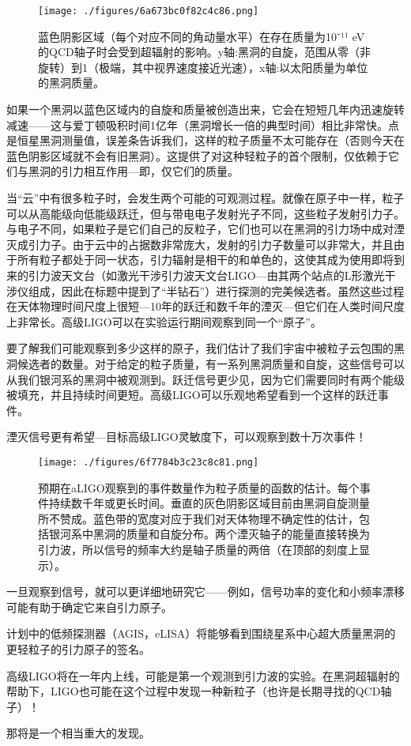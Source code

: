 \begin{figure}[ht]
\centering
\texttt{[image: ./figures/6a673bc0f82c4c86.png]}
\caption{蓝色阴影区域（每个对应不同的角动量水平）在存在质量为10⁻¹¹ eV的QCD轴子时会受到超辐射的影响。y轴:黑洞的自旋，范围从零（非旋转）到1（极端，其中视界速度接近光速），x轴:以太阳质量为单位的黑洞质量。} \label{fig_GAtom_3}
\end{figure}

如果一个黑洞以蓝色区域内的自旋和质量被创造出来，它会在短短几年内迅速旋转减速——这与爱丁顿吸积时间1亿年（黑洞增长一倍的典型时间）相比非常快。点是恒星黑洞测量值，误差条告诉我们，这样的粒子质量不太可能存在（否则今天在蓝色阴影区域就不会有旧黑洞）。这提供了对这种轻粒子的首个限制，仅依赖于它们与黑洞的引力相互作用—即，仅它们的质量。

当“云”中有很多粒子时，会发生两个可能的可观测过程。就像在原子中一样，粒子可以从高能级向低能级跃迁，但与带电电子发射光子不同，这些粒子发射引力子。与电子不同，如果粒子是它们自己的反粒子，它们也可以在黑洞的引力场中成对湮灭成引力子。由于云中的占据数非常庞大，发射的引力子数量可以非常大，并且由于所有粒子都处于同一状态，引力辐射是相干的和单色的，这使其成为使用即将到来的引力波天文台（如激光干涉引力波天文台LIGO—由其两个站点的L形激光干涉仪组成，因此在标题中提到了“半钻石”）进行探测的完美候选者。虽然这些过程在天体物理时间尺度上很短—10年的跃迁和数千年的湮灭—但它们在人类时间尺度上非常长。高级LIGO可以在实验运行期间观察到同一个“原子”。

要了解我们可能观察到多少这样的原子，我们估计了我们宇宙中被粒子云包围的黑洞候选者的数量。对于给定的粒子质量，有一系列黑洞质量和自旋，这些信号可以从我们银河系的黑洞中被观测到。跃迁信号更少见，因为它们需要同时有两个能级被填充，并且持续时间更短。高级LIGO可以乐观地希望看到一个这样的跃迁事件。

湮灭信号更有希望—目标高级LIGO灵敏度下，可以观察到数十万次事件！

\begin{figure}[ht]
\centering
\texttt{[image: ./figures/6f7784b3c23c8c81.png]}
\caption{预期在aLIGO观察到的事件数量作为粒子质量的函数的估计。每个事件持续数千年或更长时间。垂直的灰色阴影区域目前由黑洞自旋测量所不赞成。蓝色带的宽度对应于我们对天体物理不确定性的估计，包括银河系中黑洞的质量和自旋分布。两个湮灭轴子的能量直接转换为引力波，所以信号的频率大约是轴子质量的两倍（在顶部的刻度上显示）。} \label{fig_GAtom_4}
\end{figure}


一旦观察到信号，就可以更详细地研究它——例如，信号功率的变化和小频率漂移可能有助于确定它来自引力原子。

计划中的低频探测器（AGIS，eLISA）将能够看到围绕星系中心超大质量黑洞的更轻粒子的引力原子的签名。

高级LIGO将在一年内上线，可能是第一个观测到引力波的实验。在黑洞超辐射的帮助下，LIGO也可能在这个过程中发现一种新粒子（也许是长期寻找的QCD轴子）！

那将是一个相当重大的发现。





